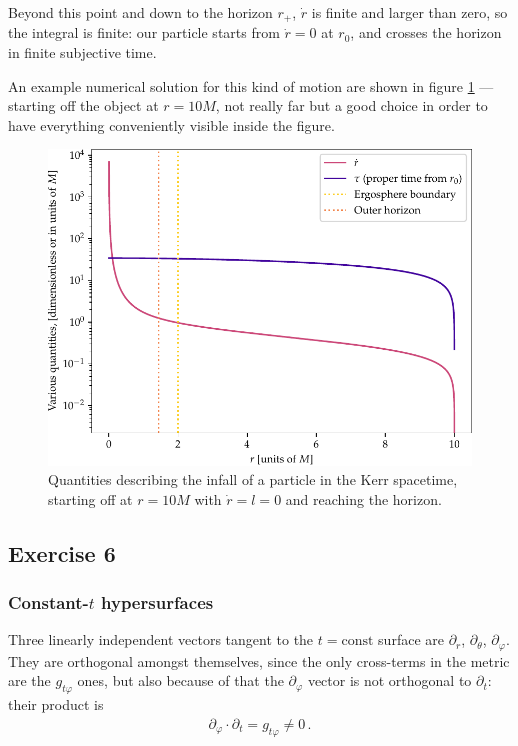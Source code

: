 \documentclass[main.tex]{subfiles}
\begin{document}
Beyond this point and down to the horizon \(r_+\), \(\dot{r}\) is finite and larger than zero, so the integral is finite: our particle starts from \(\dot{r} = 0\) at \(r_0 \), and crosses the horizon in finite subjective time.


An example numerical solution for this kind of motion are shown in figure \ref{fig:kerr_infall} --- starting off the object at \(r = 10M\), not really far but a good choice in order to have everything conveniently visible inside the figure.

\begin{figure}[ht]
\centering
\includegraphics[width=.9\textwidth]{figures/kerr_infall}
\caption{Quantities describing the infall of a particle in the Kerr spacetime, starting off at \(r = 10M\) with \(\dot{r} = l = 0\) and reaching the horizon.}
\label{fig:kerr_infall}
\end{figure}

\subsection{Exercise 6}

\subsubsection{Constant-$t$ hypersurfaces}

Three linearly independent vectors tangent to the \(t = \text{const}\) surface are \(\partial_r\), \(\partial_\theta \), \(\partial_\varphi \). 
They are orthogonal amongst themselves, since the only cross-terms in the metric are the \(g_{t \varphi }\) ones, but also because of that the \(\partial_\varphi \) vector is not orthogonal to \(\partial_t\): their product is %
\begin{align}
\partial_\varphi \cdot \partial_t = g_{t \varphi} \neq 0
\,.
\end{align}
\end{document}
